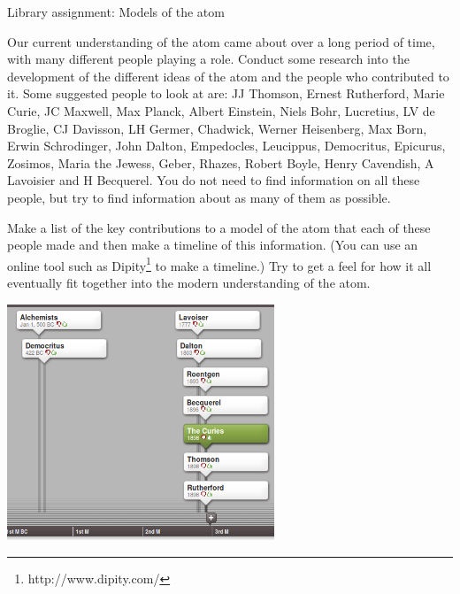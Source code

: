             \begin{project}{Library assignment: Models of the atom}
            \nopagebreak
            \label{m38756*eip-3}

Our current understanding of the atom came about over a long period of time, with many different people playing a role. Conduct some research into the development of the different ideas of the atom and the people who contributed to it. Some suggested people to look at are: JJ Thomson, Ernest Rutherford, Marie Curie, JC Maxwell, Max Planck, Albert Einstein, Niels Bohr, Lucretius, LV de Broglie, CJ Davisson, LH Germer, Chadwick, Werner Heisenberg, Max Born, Erwin Schrodinger, John Dalton, Empedocles, Leucippus, Democritus, Epicurus, Zosimos, Maria the Jewess, Geber, Rhazes, Robert Boyle, Henry Cavendish, A Lavoisier and H Becquerel. You do not need to find information on all these people, but try to find information about as many of them as possible.
\par \begin{minipage}{.5\textwidth}
\label{m38756*id7342}Make a list of the key contributions to a model of the atom that each of these people made and then make a timeline of this information. (You can use an online tool such as Dipity\footnote{http://www.dipity.com/}
         to make a timeline.) Try to get a feel for how it all eventually fit together into the modern understanding of the atom. 
\end{minipage}
\begin{minipage}{.5\textwidth}
 \begin{center}
  \includegraphics[width=0.6\textwidth]{photos/timeline_atom.png}
 \end{center}

\end{minipage}

\end{project}
\par \label{m38756*cid2}
